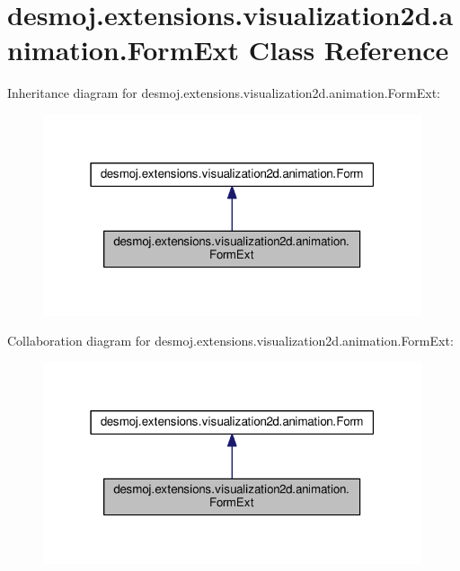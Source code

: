 \section{desmoj.\-extensions.\-visualization2d.\-animation.\-Form\-Ext Class Reference}
\label{classdesmoj_1_1extensions_1_1visualization2d_1_1animation_1_1_form_ext}


Inheritance diagram for desmoj.\-extensions.\-visualization2d.\-animation.\-Form\-Ext\-:
\nopagebreak
\begin{figure}[H]
\begin{center}
\leavevmode
\includegraphics[width=316pt]{classdesmoj_1_1extensions_1_1visualization2d_1_1animation_1_1_form_ext__inherit__graph}
\end{center}
\end{figure}


Collaboration diagram for desmoj.\-extensions.\-visualization2d.\-animation.\-Form\-Ext\-:
\nopagebreak
\begin{figure}[H]
\begin{center}
\leavevmode
\includegraphics[width=316pt]{classdesmoj_1_1extensions_1_1visualization2d_1_1animation_1_1_form_ext__coll__graph}
\end{center}
\end{figure}
